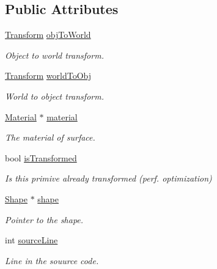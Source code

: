 \subsection*{Public Attributes}
\begin{DoxyCompactItemize}
\item 
\mbox{\label{class_primitive_a90ade4496ac999b20934f40acf44116c}} 
\mbox{\hyperlink{class_transform}{Transform}} \mbox{\hyperlink{class_primitive_a90ade4496ac999b20934f40acf44116c}{obj\+To\+World}}
\begin{DoxyCompactList}\small\item\em Object to world transform. \end{DoxyCompactList}\item 
\mbox{\label{class_primitive_a99d734d04ac19afb5c086f90abe4f476}} 
\mbox{\hyperlink{class_transform}{Transform}} \mbox{\hyperlink{class_primitive_a99d734d04ac19afb5c086f90abe4f476}{world\+To\+Obj}}
\begin{DoxyCompactList}\small\item\em World to object transform. \end{DoxyCompactList}\item 
\mbox{\label{class_primitive_a4c6d102affb9b8569a0000c728b07bfb}} 
\mbox{\hyperlink{class_material}{Material}} $\ast$ \mbox{\hyperlink{class_primitive_a4c6d102affb9b8569a0000c728b07bfb}{material}}
\begin{DoxyCompactList}\small\item\em The material of surface. \end{DoxyCompactList}\item 
\mbox{\label{class_primitive_a1934284f80b0b26f216ad551118e65cc}} 
bool \mbox{\hyperlink{class_primitive_a1934284f80b0b26f216ad551118e65cc}{is\+Transformed}}
\begin{DoxyCompactList}\small\item\em Is this primive already transformed (perf. optimization) \end{DoxyCompactList}\item 
\mbox{\label{class_primitive_a668eec3b66b4aa4d995c8b47c85d253a}} 
\mbox{\hyperlink{class_shape}{Shape}} $\ast$ \mbox{\hyperlink{class_primitive_a668eec3b66b4aa4d995c8b47c85d253a}{shape}}
\begin{DoxyCompactList}\small\item\em Pointer to the shape. \end{DoxyCompactList}\item 
\mbox{\label{class_primitive_ad0f80173b7625a9f2855088adbae6b0e}} 
int \mbox{\hyperlink{class_primitive_ad0f80173b7625a9f2855088adbae6b0e}{source\+Line}}
\begin{DoxyCompactList}\small\item\em Line in the souurce code. \end{DoxyCompactList}\end{DoxyCompactItemize}


